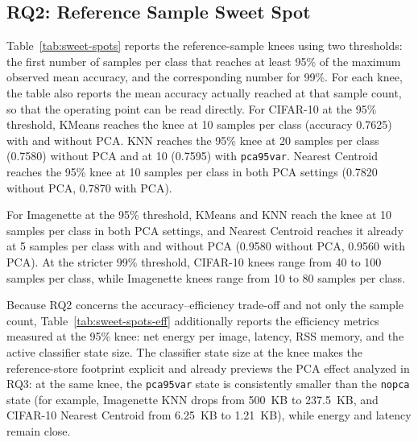 \documentclass[sigconf,review,nonacm]{acmart}
\begin{document}
\subsection{RQ2: Reference Sample Sweet Spot}
Table~\ref{tab:sweet-spots} reports the reference-sample knees using two thresholds: the first number of samples per class that reaches at least 95\% of the maximum observed mean accuracy, and the corresponding number for 99\%.
For each knee, the table also reports the mean accuracy actually reached at that sample count, so that the operating point can be read directly.
For CIFAR-10 at the 95\% threshold, KMeans reaches the knee at 10 samples per class (accuracy 0.7625) with and without PCA.
KNN reaches the 95\% knee at 20 samples per class (0.7580) without PCA and at 10 (0.7595) with \texttt{pca95var}.
Nearest Centroid reaches the 95\% knee at 10 samples per class in both PCA settings (0.7820 without PCA, 0.7870 with PCA).

For Imagenette at the 95\% threshold, KMeans and KNN reach the knee at 10 samples per class in both PCA settings, and Nearest Centroid reaches it already at 5 samples per class with and without PCA (0.9580 without PCA, 0.9560 with PCA).
At the stricter 99\% threshold, CIFAR-10 knees range from 40 to 100 samples per class, while Imagenette knees range from 10 to 80 samples per class.

Because RQ2 concerns the accuracy--efficiency trade-off and not only the sample count, Table~\ref{tab:sweet-spots-eff} additionally reports the efficiency metrics measured at the 95\% knee: net energy per image, latency, RSS memory, and the active classifier state size.
The classifier state size at the knee makes the reference-store footprint explicit and already previews the PCA effect analyzed in RQ3: at the same knee, the \texttt{pca95var} state is consistently smaller than the \texttt{nopca} state (for example, Imagenette KNN drops from 500~KB to 237.5~KB, and CIFAR-10 Nearest Centroid from 6.25~KB to 1.21~KB), while energy and latency remain close.
\end{document}
